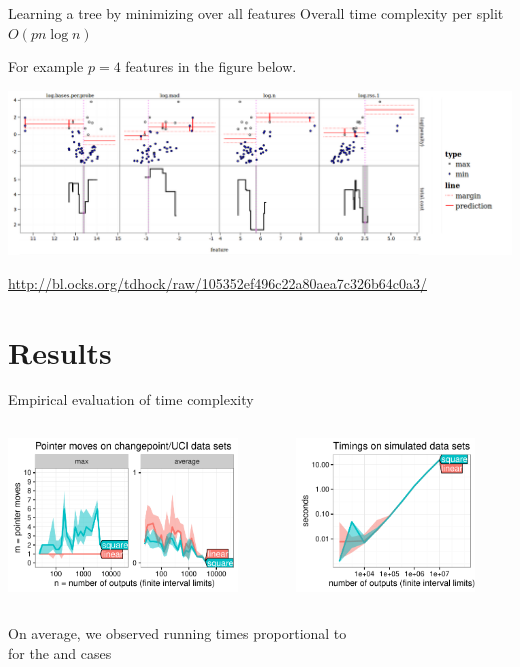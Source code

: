 \documentclass{beamer}
\begin{document}
\begin{frame}{Learning a tree by minimizing over all features}
Overall time complexity per split $O(p n \log n)$

For example $p=4$ features in the figure below.

\includegraphics[width=\textwidth]{screenshot-search-over-features}

\small
\url{http://bl.ocks.org/tdhock/raw/105352ef496c22a80aea7c326b64c0a3/}

\end{frame}


\section{Results}


\begin{frame}{Empirical evaluation of time complexity}
	\begin{center}
		\begin{columns}
			\begin{column}{0.5\textwidth}
				\hspace*{3mm}
				\includegraphics[height=1.6in]{figures/paper/figure-moves.pdf}
			\end{column}
			\begin{column}{0.5\textwidth}
				\hspace*{3mm}
				\includegraphics[height=1.6in]{figures/paper/figure-simulated-seconds.pdf}
			\end{column}
		\end{columns}
	\vspace{5mm}
	On average, we observed running times proportional to\\  for the  and  cases
	\end{center}
\end{frame}
\end{document}
